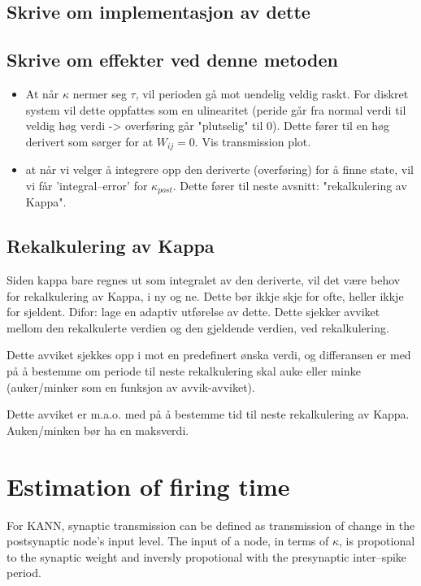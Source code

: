 		\subsection{Skrive om implementasjon av dette}
		\subsection{Skrive om effekter ved denne metoden}
			\begin{itemize}
				\item At når $\kappa$ nermer seg $\tau$, vil perioden gå mot uendelig veldig raskt. For diskret system vil dette oppfattes som en ulinearitet 
				(peride går fra normal verdi til veldig høg verdi -> overføring går "plutselig" til 0). Dette fører til en høg derivert som sørger for at $W_{ij}=0$. Vis transmission plot.
				\item at når vi velger å integrere opp den deriverte (overføring) for å finne state, vil vi får 'integral--error' for $\kappa_{post}$.
				Dette fører til neste avsnitt: "rekalkulering av Kappa".
			\end{itemize}


		\subsection{Rekalkulering av Kappa}
		Siden kappa bare regnes ut som integralet av den deriverte, vil det være behov for rekalkulering av Kappa, i ny og ne. Dette bør ikkje skje for ofte, heller ikkje for sjeldent.
		Difor: lage en adaptiv utførelse av dette. Dette sjekker avviket mellom den rekalkulerte verdien og den gjeldende verdien, ved rekalkulering. 

		Dette avviket sjekkes opp i mot en predefinert ønska verdi, og differansen er med på å bestemme om periode til neste rekalkulering skal auke eller minke (auker/minker som en funksjon av avvik-avviket). 

		Dette avviket er m.a.o. med på å bestemme tid til neste rekalkulering av Kappa.
		Auken/minken bør ha en maksverdi.




	\section{Estimation of firing time}
	For KANN, synaptic transmission can be defined as transmission of change in the postsynaptic node's input level.
	The input of a node, in terms of $\kappa$, is propotional to the synaptic weight and inversly propotional with the presynaptic inter--spike period.

